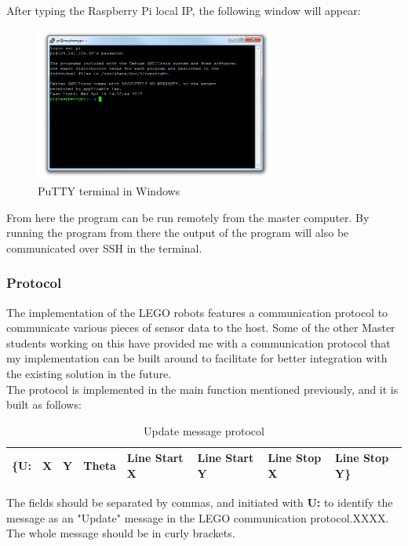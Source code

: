 After typing the Raspberry Pi local IP, the following window will appear: 

\begin{figure}[H]
  \centering
  \includegraphics[width=0.7\textwidth]{fig/putty2}
  \caption{PuTTY terminal in Windows}
  \label{fig:putty}
\end{figure}
From here the program can be run remotely from the master computer. By running the program from there the output of the program will also be communicated over SSH in the terminal. 

\subsubsection{Protocol}
The implementation of the LEGO robots features a communication protocol to communicate various pieces of sensor data to the host. Some of the other Master students working on this have provided me with a communication protocol that my implementation can be built around to facilitate for better integration with the existing solution in the future. \\

The protocol is implemented in the main function mentioned previously, and it is built as follows:

\begin{table}[H]
\centering
\label{protocol}
\begin{tabular}{|l|l|l|l|l|l|l|l|}
\hline
\textbf{\{U:} & \textbf{X} & \textbf{Y} & \textbf{Theta} & \textbf{Line Start X} & \textbf{Line Start Y} & \textbf{Line Stop X} & \textbf{Line Stop Y\}} \\ \hline
\end{tabular}
\caption{Update message protocol}
\end{table}

The fields should be separated by commas, and initiated with \textbf{U:} to identify the message as an "Update" message in the LEGO communication protocol.XXXX. The whole message should be in curly brackets. \\

